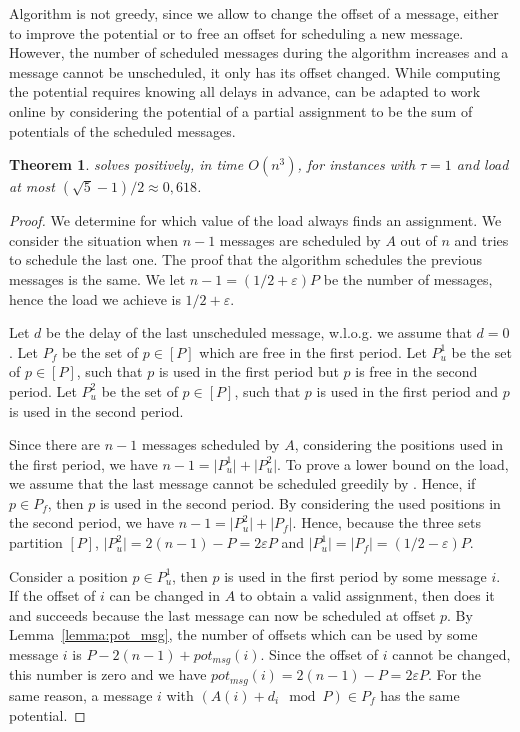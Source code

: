 \documentclass[pdflatex,sn-mathphys,iicol]{sn-jnl}%
\theoremstyle{thmstyleone}%
\newtheorem{theorem}{Theorem}%
\theoremstyle{thmstyletwo}%
\theoremstyle{thmstylethree}%
\begin{document}
Algorithm \swapandmove is not greedy, since we allow to change the offset of a message, either to improve the potential or to free an offset for scheduling a new message. However, the number of scheduled messages during the algorithm increases and a message cannot be unscheduled, it only has its offset changed.
While computing the potential requires knowing all delays in advance, \swapandmove can be adapted to work online by considering the potential of a partial assignment to be the sum of potentials of the scheduled messages.


\begin{theorem}
\swapandmove solves \pma positively, in time $O(n^3)$, for instances with $\tau =1$ and load at most $(\sqrt{5}-1)/2 \approx 0,618$.
\end{theorem}

\begin{proof}
We determine for which value of the load \swapandmove always finds an assignment.
We consider the situation when $n-1$ messages are scheduled by $A$ out of $n$ and \swapandmove tries to schedule the last one. The proof that the algorithm schedules the previous messages is the same. We let $n - 1 = (1/2 + \varepsilon)P$ be the number of messages, hence the load we achieve is $1/2 + \varepsilon$. 

Let $d$ be the delay of the last unscheduled message, w.l.o.g. we assume that $d = 0$. 
Let $P_f$ be the set of $p\in [P]$ which are free in the first period. Let $P^1_{u}$ be the set of $p\in [P]$, such that $p$ is used in the first period but $p$ is free in the second period. Let $P^2_{u}$ be the set of $p\in [P]$, such that $p$ is used in the first period and $p$ is used in the second period. 

Since there are $n-1$ messages scheduled by $A$, considering the positions used in the first period, we have $n-1 = \lvert P^1_u\rvert + \lvert P^2_u\rvert$.
To prove a lower bound on the load, we assume that the last message cannot be scheduled greedily by \swapandmove. Hence, if $p\in P_f$, then $p$ is used in the second period. By considering the used positions in the second period, we have $n - 1 = \lvert P^2_u\rvert + \lvert P_f\rvert$.
Hence, because the three sets partition $[P]$, $\lvert P^2_u\rvert = 2(n-1) - P = 2\varepsilon P$ and $\lvert P^1_u\rvert = \lvert P_f\rvert = (1/2 - \varepsilon)P$.

Consider a position $p \in P^1_u$, then $p$ is used in the first period by some message $i$.
If the offset of $i$ can be changed in $A$ to obtain a valid assignment, then \swapandmove does it and succeeds because the last message can now be scheduled at offset $p$.
By Lemma~\ref{lemma:pot_msg}, the number of offsets which can be used by some message $i$ is $P- 2(n-1) + pot_{msg}(i)$. Since the offset of $i$ cannot be changed, this number is zero and we have $pot_{msg}(i) = 2(n-1) - P = 2\varepsilon P$. For the same reason, a message $i$ with $(A(i) + d_i \mod P) \in P_f$ has the same potential.


\end{proof}
\end{document}
